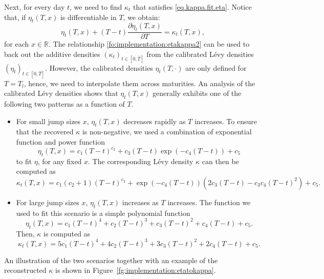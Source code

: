 \documentclass{article}
\numberwithin{equation}{section}
\newcommand\RR {\mathbb R}
\def\bT{\bar{T}}
\begin{document}
Next, for every day $t$, we need to find $\kappa_t$ that satisfies \eqref{eq.kappa.fit.eta}.
Notice that, if $\eta_t(T,x)$ is differentiable in $T$, we obtain: 
\begin{equation} \label{fo:implementation:etakappa2}
\eta_t(T,x)+(T-t)\frac{\partial\eta_t(T,x)}{\partial T} = \kappa_t(T,x),
\end{equation}
for each $x \in \RR$. The relationship \eqref{fo:implementation:etakappa2} can be used to back out the additive densities $(\kappa_t)_{t\in[0,\bT]}$ from the calibrated L\'{e}vy densities $(\eta_t)_{t\in[0,\bT]}$. However, the calibrated densities $\eta_t(T,\cdot)$ are only defined for $T=T_l$, hence, we need to interpolate them across maturities.
An analysis of the calibrated L\'{e}vy densities shows that $\eta_t(T,x)$ generally exhibits one of the following two patterns as a function of $T$.   
\begin{itemize}
\item For small jump sizes $x$, $\eta_t(T,x)$ decreases rapidly as $T$ increases. To ensure that the recovered $\kappa$ is non-negative, we used a combination of exponential function and power function
\begin{equation}
\eta_t(T,x) = c_1 (T-t)^{c_2} + c_3(T-t) \exp(-c_4 (T-t)) + c_5
\end{equation}
to fit $\eta$, for any fixed $x$. The corresponding L\'evy density $\kappa$ can then be computed as
\begin{equation}
\kappa_t(T,x) = c_1(c_2+1)(T-t)^{c_2} + \exp(-c_4(T-t))(2c_3(T-t)-c_3c_4(T-t)^2) + c_5.
\end{equation}

\item For large jump sizes $x$, $\eta_t(T,x)$ increases as $T$ increases. The function we used to fit this scenario is a simple polynomial function
\begin{equation}
\eta_t(T,x) = c_1 (T-t)^4 + c_2 (T-t)^3 + c_3(T-t)^2 + c_4(T-t) + c_5. 
\end{equation}
Then, $\kappa$ is computed as
\begin{equation}
\kappa_t(T,x) = 5c_1(T-t)^4 + 4c_2(T-t)^3 + 3c_3(T-t)^2 + 2c_4(T-t) + c_5.
\end{equation}
\end{itemize}

An illustration of the two scenarios together with an example of the reconstructed $\kappa$ is shown in Figure~\ref{fg:implementation:etatokappa}.
\end{document}
